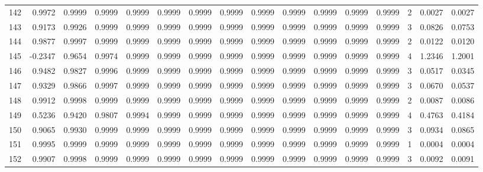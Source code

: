 \begin{tabular}{lrrrrrrrrrrrrrrr}
142 &      0.9972 &  0.9999 &  0.9999 &  0.9999 &  0.9999 &  0.9999 &  0.9999 &  0.9999 &  0.9999 &  0.9999 &   0.9999 &     0.9999 &      2 &                    0.0027 &                     0.0027 \\
143 &      0.9173 &  0.9926 &  0.9999 &  0.9999 &  0.9999 &  0.9999 &  0.9999 &  0.9999 &  0.9999 &  0.9999 &   0.9999 &     0.9999 &      3 &                    0.0826 &                     0.0753 \\
144 &      0.9877 &  0.9997 &  0.9999 &  0.9999 &  0.9999 &  0.9999 &  0.9999 &  0.9999 &  0.9999 &  0.9999 &   0.9999 &     0.9999 &      2 &                    0.0122 &                     0.0120 \\
145 &     -0.2347 &  0.9654 &  0.9974 &  0.9999 &  0.9999 &  0.9999 &  0.9999 &  0.9999 &  0.9999 &  0.9999 &   0.9999 &     0.9999 &      4 &                    1.2346 &                     1.2001 \\
146 &      0.9482 &  0.9827 &  0.9996 &  0.9999 &  0.9999 &  0.9999 &  0.9999 &  0.9999 &  0.9999 &  0.9999 &   0.9999 &     0.9999 &      3 &                    0.0517 &                     0.0345 \\
147 &      0.9329 &  0.9866 &  0.9997 &  0.9999 &  0.9999 &  0.9999 &  0.9999 &  0.9999 &  0.9999 &  0.9999 &   0.9999 &     0.9999 &      3 &                    0.0670 &                     0.0537 \\
148 &      0.9912 &  0.9998 &  0.9999 &  0.9999 &  0.9999 &  0.9999 &  0.9999 &  0.9999 &  0.9999 &  0.9999 &   0.9999 &     0.9999 &      2 &                    0.0087 &                     0.0086 \\
149 &      0.5236 &  0.9420 &  0.9807 &  0.9994 &  0.9999 &  0.9999 &  0.9999 &  0.9999 &  0.9999 &  0.9999 &   0.9999 &     0.9999 &      4 &                    0.4763 &                     0.4184 \\
150 &      0.9065 &  0.9930 &  0.9999 &  0.9999 &  0.9999 &  0.9999 &  0.9999 &  0.9999 &  0.9999 &  0.9999 &   0.9999 &     0.9999 &      3 &                    0.0934 &                     0.0865 \\
151 &      0.9995 &  0.9999 &  0.9999 &  0.9999 &  0.9999 &  0.9999 &  0.9999 &  0.9999 &  0.9999 &  0.9999 &   0.9999 &     0.9999 &      1 &                    0.0004 &                     0.0004 \\
152 &      0.9907 &  0.9998 &  0.9999 &  0.9999 &  0.9999 &  0.9999 &  0.9999 &  0.9999 &  0.9999 &  0.9999 &   0.9999 &     0.9999 &      3 &                    0.0092 &                     0.0091 \\

\end{tabular}
